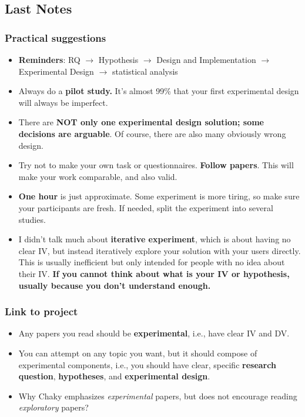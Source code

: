\documentclass{beamer}
\begin{document}
\subsection{Last Notes}

\begin{frame}
	\frametitle{Practical suggestions}
	\footnotesize
	\begin{itemize}
		\item \textbf{Reminders}:  RQ $\rightarrow$ Hypothesis $\rightarrow$ Design and Implementation $\rightarrow$ Experimental Design $\rightarrow$ statistical analysis
		\item Always do a \textbf{pilot study.}   It's almost 99\% that your first experimental design will always be imperfect.
		\item There are \textbf{NOT only one experimental design solution;  some decisions are arguable}.   Of course, there are also many obviously wrong design.
		\item Try not to make your own task or questionnaires.  \textbf{Follow papers}.   This will make your work comparable, and also valid.
		\item \textbf{One hour} is just approximate.  Some experiment is more tiring, so make sure your participants are fresh.   If needed, split the experiment into several studies.
		\item I didn't talk much about \textbf{iterative experiment}, which is about having no clear IV, but instead iteratively explore your solution with your users directly.   This is usually inefficient but only intended for people with no idea about their IV.  \textbf{If you cannot think about what is your IV or hypothesis, usually because you don't understand enough.}
	\end{itemize}		
\end{frame}

\begin{frame}
	\frametitle{Link to project}
	\begin{itemize}
		\item Any papers you read should be \textbf{experimental}, i.e., have clear IV and DV. 
		\item You can attempt on any topic you want, but it should compose of experimental components, i.e., you should have clear, specific \textbf{research question}, \textbf{hypotheses}, and \textbf{experimental design}. 
		\item Why Chaky emphasizes \textit{experimental} papers, but does not encourage reading \textit{exploratory} papers?
	\end{itemize}		
\end{frame}
\end{document}
